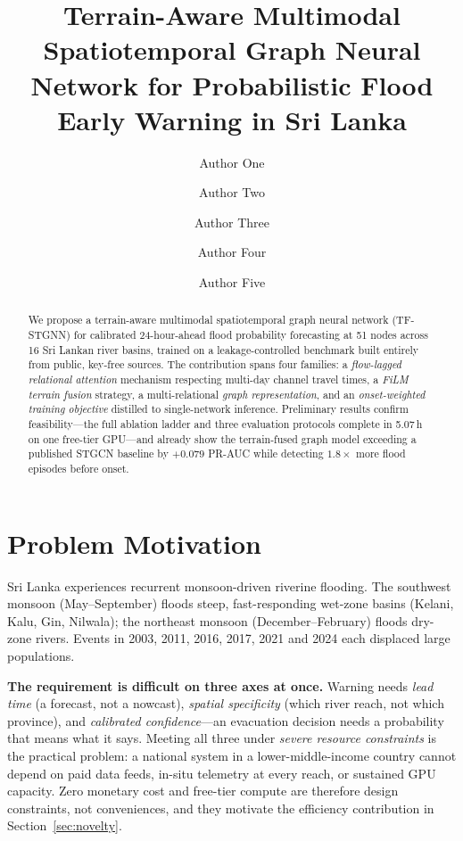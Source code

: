 \documentclass[sigconf]{acmart}
\begin{document}
\title{Terrain-Aware Multimodal Spatiotemporal Graph Neural Network for Probabilistic Flood Early Warning in Sri Lanka}

\author{Author One}
\author{Author Two}
\author{Author Three}
\author{Author Four}
\author{Author Five}

\begin{abstract}
We propose a terrain-aware multimodal spatiotemporal graph neural network (TF-STGNN) for calibrated 24-hour-ahead flood probability forecasting at 51 nodes across 16 Sri Lankan river basins, trained on a leakage-controlled benchmark built entirely from public, key-free sources. The contribution spans four families: a \emph{flow-lagged relational attention} mechanism respecting multi-day channel travel times, a \emph{FiLM terrain fusion} strategy, a multi-relational \emph{graph representation}, and an \emph{onset-weighted training objective} distilled to single-network inference. Preliminary results confirm feasibility---the full ablation ladder and three evaluation protocols complete in 5.07\,h on one free-tier GPU---and already show the terrain-fused graph model exceeding a published STGCN baseline by $+0.079$ PR-AUC while detecting $1.8\times$ more flood episodes before onset.
\end{abstract}


\maketitle

\section{Problem Motivation}

Sri Lanka experiences recurrent monsoon-driven riverine flooding. The southwest monsoon (May--September) floods steep, fast-responding wet-zone basins (Kelani, Kalu, Gin, Nilwala); the northeast monsoon (December--February) floods dry-zone rivers. Events in 2003, 2011, 2016, 2017, 2021 and 2024 each displaced large populations.

\textbf{The requirement is difficult on three axes at once.} Warning needs \emph{lead time} (a forecast, not a nowcast), \emph{spatial specificity} (which river reach, not which province), and \emph{calibrated confidence}---an evacuation decision needs a probability that means what it says. Meeting all three under \emph{severe resource constraints} is the practical problem: a national system in a lower-middle-income country cannot depend on paid data feeds, in-situ telemetry at every reach, or sustained GPU capacity. Zero monetary cost and free-tier compute are therefore design constraints, not conveniences, and they motivate the efficiency contribution in Section~\ref{sec:novelty}.
\end{document}
